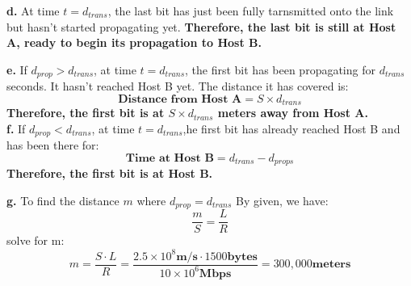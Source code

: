 \documentclass{cshwk}
\begin{document}
\noindent\textbf{d.} At time $t = d_{trans}$, the last bit has just been fully tarnsmitted onto the link but hasn't started propagating yet. \textbf{Therefore, the last bit is still at Host A, ready to begin its propagation to Host B.}

\noindent\textbf{e.} If $d_{prop} > d_{trans}$, at time $t=d_{trans}$, the first bit has been propagating for $d_{trans}$ seconds. It hasn't reached Host B yet. The distance it has covered is:
$$
    \textbf{Distance from Host A} = S \times d_{trans}
$$
\textbf{Therefore, the first bit is at $S\times d_{trans}$ meters away from Host A.}
\\

\noindent\textbf{f.} If $d_{prop} < d_{trans}$, at time $t=d_{trans}$,he first bit has already reached Host B and has been there for:
$$
    \textbf{Time at Host B} = d_{trans} - d_{props}
$$
\textbf{Therefore, the first bit is at Host B.}

\noindent\textbf{g.} To find the distance $m$ where $d_{prop} = d_{trans}$
By given, we have:
$$
    \frac{m}{S} = \frac{L}{R}
$$
solve for m:
$$
    \boxed{
        m = \frac{S\cdot L}{R} = \frac{2.5\times 10^8 \textbf{m/s}\cdot 1500 \textbf{bytes}}{10 \times 10^6 \textbf{Mbps}} = 300,000\textbf{meters}
    }
$$
\end{document}
